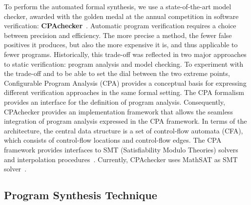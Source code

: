 \documentclass[journal]{IEEEtran}
\begin{document}
To perform the automated formal synthesis, we use a state-of-the-art model checker, awarded with the golden medal at the annual competition in software verification: \textbf{CPAchecker}~\cite{LMU2019}. Automatic program verification requires a choice between precision and efficiency. The more precise a method, the fewer false positives it produces, but also the more expensive it is, and thus applicable to fewer programs. Historically, this trade-off was reflected in two major approaches to static verification: program analysis and model checking. To experiment with the trade-off and to be able to set the dial between the two extreme points, Configurable Program Analysis (CPA) provides a conceptual basis for expressing different verification approaches in the same formal setting. The CPA formalism provides an interface for the definition of program analysis. Consequently, CPAchecker provides an implementation framework that allows the seamless integration of program analysis expressed in the CPA framework. In terms of the architecture, the central data structure is a set of control-flow automata (CFA), which consists of control-flow locations and control-flow edges. The CPA framework provides interfaces to SMT (Satisfiability Modulo Theories) solvers and interpolation procedures~\cite{Beyer2011}. Currently, CPAchecker uses MathSAT as SMT solver~\cite{Beyer2011}.



%
\subsection{Program Synthesis Technique}
\label{sec:ProgramSynthesis}
\end{document}
